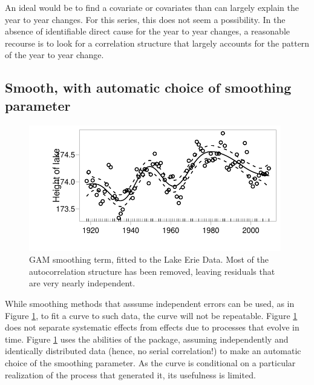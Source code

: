 An ideal would be to find a covariate or covariates than can largely
explain the year to year changes.  For this series, this does not seem
a possibility.  In the absence of identifiable direct cause for the
year to year changes, a reasonable recourse is to look for a
correlation structure that largely accounts for the pattern of the
year to year change.  

\subsection*{Smooth, with automatic choice of smoothing parameter}

\begin{figure}
\begin{Schunk}


\centerline{\includegraphics[width=0.98\textwidth]{figs/9-gamErie-1} }

\end{Schunk}
\caption{GAM smoothing term, fitted to the Lake Erie Data.
    Most of the autocorrelation structure has been
    removed, leaving residuals that are very nearly independent.
  }\label{lh-smoothplot}
\end{figure}

\begin{marginfigure}[-3.5cm]
\begin{Schunk}
\end{Schunk}
\end{marginfigure}

While smoothing methods that asssume independent errors can be
used, as in Figure \ref{lh-smoothplot}, to fit a curve to such
data, the curve will not be repeatable.  Figure \ref{lh-smoothplot}
does not separate systematic effects from effects due to processes
that evolve in time. Figure \ref{lh-smoothplot} uses the
abilities of the  package, assuming independently and
identically distributed data (hence, no serial correlation!) to
make an automatic choice of the smoothing parameter.  
As the curve is conditional on a particular realization of the process
that generated it, its usefulness is limited.

